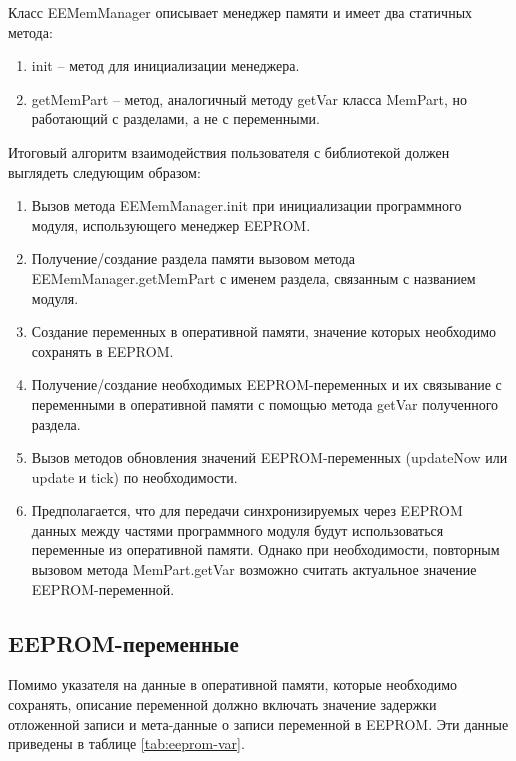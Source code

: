 Класс EEMemManager описывает менеджер памяти и имеет два статичных метода:
\begin{enumerate}
	\item init -- метод для инициализации менеджера.
	\item getMemPart -- метод, аналогичный методу getVar класса MemPart, но работающий с разделами, а не с переменными.
\end{enumerate}


Итоговый алгоритм взаимодействия пользователя с библиотекой должен выглядеть следующим образом:
\begin{enumerate}
	\item Вызов метода EEMemManager.init при инициализации программного модуля, использующего менеджер EEPROM.
	\item Получение/создание раздела памяти вызовом метода EEMemManager.getMemPart с именем раздела, связанным с названием модуля.
	\item Создание переменных в оперативной памяти, значение которых необходимо сохранять в EEPROM.
	\item Получение/создание необходимых EEPROM-переменных и их связывание с переменными в оперативной памяти с помощью метода getVar полученного раздела.
	\item Вызов методов обновления значений EEPROM-переменных (updateNow или update и tick) по необходимости.
	\item Предполагается, что для передачи синхронизируемых через EEPROM данных между частями программного модуля будут использоваться переменные из оперативной памяти. Однако при необходимости, повторным вызовом метода MemPart.getVar возможно считать актуальное значение EEPROM-переменной.
\end{enumerate}


\subsection{EEPROM-переменные}

Помимо указателя на данные в оперативной памяти, которые необходимо сохранять, описание переменной должно включать значение задержки отложенной записи и мета-данные о записи переменной в EEPROM.
Эти данные приведены в таблице \ref{tab:eeprom-var}.

